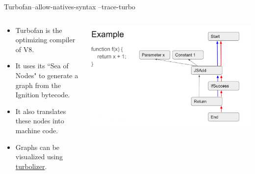 \begin{frame}{Turbofan}{--allow-natives-syntax --trace-turbo}
    \begin{columns}
        \begin{column}{0.33\textwidth}
            \begin{itemize}
                \item Turbofan is the optimizing compiler of V8.
                \item It uses its ``Sea of Nodes" to generate a graph from the Ignition bytecode. 
                \item It also translates these nodes into machine code.
                \item Graphs can be visualized using \href{https://chromium.googlesource.com/v8/v8/+/refs/heads/main/tools/turbolizer/}{\color{pink}turbolizer}. 
            \end{itemize}
        \end{column}
        \begin{column}{0.67\textwidth}
            \includegraphics[width=\textwidth]{images/v8-basic-turbo-graph.png}
        \end{column}
    \end{columns}
\end{frame}

